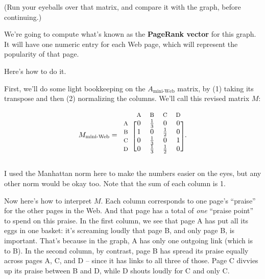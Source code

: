 \begin{alttitles}
(Run your eyeballs over that matrix, and compare it with the graph, before
continuing.)

\medskip


We're going to compute what's known as the \textbf{PageRank vector} for this
graph. It will have one numeric entry for each Web page, which will represent
the popularity of that page.

Here's how to do it.

First, we'll do some light bookkeeping on the $A_{\textrm{mini-Web}}$ matrix,
by (1) taking its transpose and then (2) normalizing the columns. We'll call
this revised matrix $M$:

\begingroup
\renewcommand*{\arraystretch}{1.2}
\[
M_{\textrm{mini-Web}} = 
\begin{blockarray}{ccccc}
& {\footnotesize\textrm{A}} & {\footnotesize\textrm{B}} & {\footnotesize\textrm{C}} & {\footnotesize\textrm{D}} \\
\begin{block}{c[cccc]}
{\footnotesize\textrm{A}} & 0 & \frac{1}{3} & 0 & 0 \\
{\footnotesize\textrm{B}} & 1 & 0 & \frac{1}{2} & 0 \\
{\footnotesize\textrm{C}} & 0 & \frac{1}{3} & 0 & 1 \\
{\footnotesize\textrm{D}} & 0 & \frac{1}{3} & \frac{1}{2} & 0 \\
\end{block}
\end{blockarray}.
\]
\endgroup


I used the Manhattan norm here to make the numbers easier on the eyes, but any
other norm would be okay too. Note that the sum of each column is 1.

Now here's how to interpret $M$. Each column corresponds to one page's
``praise'' for the other pages in the Web. And that page has a total of
\textit{one} ``praise point'' to spend on this praise. In the first column, we
see that page A has put all its eggs in one basket: it's screaming loudly that
page B, and only page B, is important. That's because in the graph, A has only
one outgoing link (which is to B). In the second column, by contrast, page B
has spread its praise equally across pages A, C, and D -- since it has links to
all three of those. Page C divvies up its praise between B and D, while D
shouts loudly for C and only C.


\end{alttitles}
